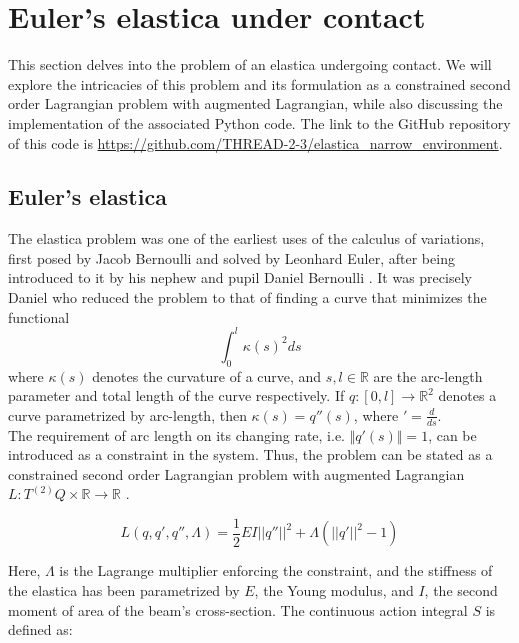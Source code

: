 
\section{Euler's elastica under contact}\label{sec:elastica}
%
This section delves into the problem of an elastica undergoing contact. We will explore the intricacies of this problem and its formulation as a constrained second order Lagrangian problem with augmented Lagrangian, while also discussing the implementation of the associated Python code. The link to the GitHub repository of this code is \url{https://github.com/THREAD-2-3/elastica_narrow_environment}. 

\subsection{Euler's elastica}
The elastica problem was one of the earliest uses of the calculus of variations, first posed by Jacob Bernoulli and solved by Leonhard Euler, after being introduced to it by his nephew and pupil Daniel Bernoulli \cite{matsutani2010}. It was precisely Daniel who reduced the problem to that of finding a curve that minimizes the functional
\begin{equation*}
    \int_0^l \kappa(s)^2 ds
\end{equation*}
where $\kappa(s)$ denotes the curvature of a curve, and $s, l \in \mathbb{R}$ are the arc-length parameter and total length of the curve respectively. If $q: [0, l] \to \mathbb{R}^2$ denotes a curve parametrized by arc-length, then $\kappa(s) = q''(s)$, where $' = \frac{d}{d s}$.\\

The requirement of arc length on its changing rate, i.e. $\Vert q'(s) \Vert = 1$, can be introduced as a constraint in the system. Thus, the problem can be stated as a constrained second order Lagrangian problem with augmented Lagrangian $L: T^{(2)}Q \times \mathbb{R} \rightarrow \mathbb{R}$ \cite{singer2008}.

\begin{equation}\label{eq:L_static_elastica}
    L \left( q, q', q'',\Lambda\right) = \frac{1}{2} EI ||q''||^2 + \Lambda (||q'||^2-1) 
\end{equation}

Here, $\Lambda$ is the Lagrange multiplier enforcing the constraint, and the stiffness of the elastica has been parametrized by $E$, the Young modulus, and $I$, the second moment of area of the beam's cross-section. The continuous action integral $S$ is defined as:

